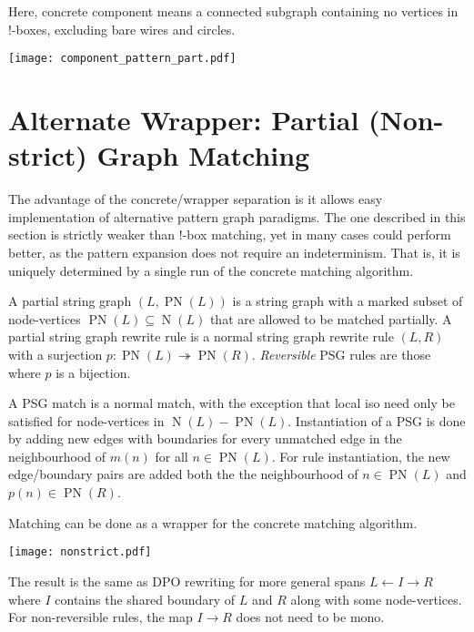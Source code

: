 \documentclass{article}
\DeclareMathOperator{\N}{N}
\DeclareMathOperator{\PN}{PN}
\begin{document}
Here, concrete component means a connected subgraph containing no vertices in !-boxes, excluding bare wires and circles.

\begin{center}
  \texttt{[image: component\_pattern\_part.pdf]}
\end{center}

\section{Alternate Wrapper: Partial (Non-strict) Graph Matching}

The advantage of the concrete/wrapper separation is it allows easy implementation of alternative pattern graph paradigms. The one described in this section is strictly weaker than $!$-box matching, yet in many cases could perform better, as the pattern expansion does not require an indeterminism. That is, it is uniquely determined by a single run of the concrete matching algorithm.

A partial string graph $(L, \PN(L))$ is a string graph with a marked subset of node-vertices $\PN(L) \subseteq \N(L)$ that are allowed to be matched partially. A partial string graph rewrite rule is a normal string graph rewrite rule $(L,R)$ with a surjection $p: \PN(L) \twoheadrightarrow \PN(R)$. \textit{Reversible} PSG rules are those where $p$ is a bijection.

A PSG match is a normal match, with the exception that local iso need only be satisfied for node-vertices in $\N(L) - \PN(L)$. Instantiation of a PSG is done by adding new edges with boundaries for every unmatched edge in the neighbourhood of $m(n)$ for all $n \in \PN(L)$. For rule instantiation, the new edge/boundary pairs are added both the the neighbourhood of $n \in \PN(L)$ and $p(n) \in \PN(R)$.

Matching can be done as a wrapper for the concrete matching algorithm.

\begin{center}
  \texttt{[image: nonstrict.pdf]}
\end{center}

The result is the same as DPO rewriting for more general spans $L \leftarrow I \rightarrow R$ where $I$ contains the shared boundary of $L$ and $R$ along with some node-vertices. For non-reversible rules, the map $I \rightarrow R$ does not need to be mono.
\end{document}
